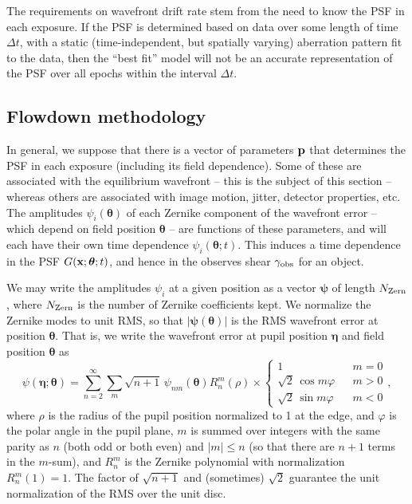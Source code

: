 The requirements on wavefront drift rate stem from the need to know the PSF in each exposure. If the PSF is determined based on data over some length of time $\Delta t$, with a static (time-independent, but spatially varying) aberration pattern fit to the data, then the ``best fit'' model will not be an accurate representation of the PSF over all epochs within the interval $\Delta t$.

\subsection{Flowdown methodology}
\label{ss:drift-method}

In general, we suppose that there is a vector of parameters ${\bf p}$ that determines the PSF in each exposure (including its field dependence). Some of these are associated with the equilibrium wavefront -- this is the subject of this section -- whereas others are associated with image motion, jitter, detector properties, etc. The amplitudes $\psi_i({\boldsymbol\theta})$ of each Zernike component of the wavefront error -- which depend on field position ${\boldsymbol\theta}$ -- are functions of these parameters, and will each have their own time dependence $\psi_i({\boldsymbol\theta};t)$. This induces a time dependence in the PSF $G({\bf x};{\boldsymbol\theta};t)$, and hence in the observes shear $\gamma_{\rm obs}$ for an object.

We may write the amplitudes $\psi_i$ at a given position as a vector ${\boldsymbol\psi}$ of length $N_{\rm Zern}$, where $N_{\rm Zern}$ is the number of Zernike coefficients kept. We normalize the Zernike modes to unit RMS, so that $|{\boldsymbol\psi}({\boldsymbol\theta})|$ is the RMS wavefront error at position ${\boldsymbol\theta}$. That is, we write the wavefront error at pupil position ${\boldsymbol\eta}$ and field position ${\boldsymbol\theta}$ as
\begin{equation}
\psi({\boldsymbol\eta};{\boldsymbol\theta}) = \sum_{n=2}^\infty \sum_{m} \sqrt{n+1}\,\psi_{nm}({\boldsymbol\theta}) R_n^m(\rho) \times\left\{\begin{array}{ccc} 1 & & m=0 \\ \sqrt2\,\cos m\varphi & & m>0 \\ \sqrt2\,\sin m\varphi & & m<0 \end{array} \right.,
\end{equation}
where $\rho$ is the radius of the pupil position normalized to 1 at the edge, and $\varphi$ is the polar angle in the pupil plane, $m$ is summed over integers with the same parity as $n$ (both odd or both even) and $|m|\le n$ (so that there are $n+1$ terms in the $m$-sum), and $R_n^m$ is the Zernike polynomial with normalization $R_n^m(1)=1$. The factor of $\sqrt{n+1}$ and (sometimes) $\sqrt2$ guarantee the unit normalization of the RMS over the unit disc.

